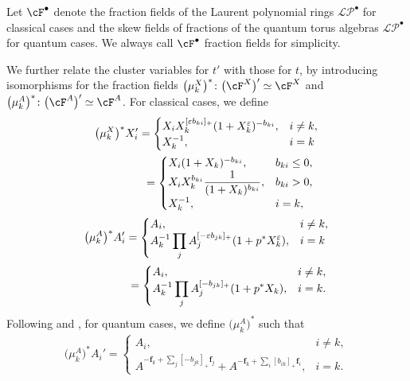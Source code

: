 \documentclass[pdftex]{sigma}
\newcommand{\LP}{{\mathcal{LP}}}
\newcommand{\ff}{\mathbf{f}}
\numberwithin{equation}{section}
\begin{document}
Let $\cF^\bullet$ denote the fraction fields of the Laurent polynomial rings $\LP^\bullet$ for classical cases and the skew fields of fractions of the quantum torus algebras $\LP^\bullet$ for quantum cases. We always call $\cF^\bullet$ fraction fields for simplicity.

We further relate the cluster variables for $t'$ with those for $t$,
by introducing isomorphisms for the fraction fields $\big(\mu_{k}^{X}\big)^{*}\colon\big(\cF^{X}\big)'\simeq\cF^{X}$
and $\big(\mu_{k}^{A}\big)^{*}\colon\big(\cF^{A}\big)'\simeq\cF^{A}$. For classical cases, we define
\begin{gather*}
\big(\mu_{k}^{X}\big)^{*}X_{i}' =\begin{cases}
X_{i}X_{k}^{[\varepsilon b_{ki}]_{+}}(1+X_{k}^{\varepsilon})^{-b_{ki}},& i\neq k,\\
X_{k}^{-1}, & i=k
\end{cases}\\
\hphantom{\big(\mu_{k}^{X}\big)^{*}X_{i}'}{} =\begin{cases}
X_{i}(1+X_{k})^{-b_{ki}}, & b_{ki}\leq0,\\
\displaystyle X_{i}X_{k}^{b_{ki}}\frac{1}{(1+X_{k})^{b_{ki}}},& b_{ki}>0,\\
X_{k}^{-1}, & i=k,
\end{cases}\\
\big(\mu_{k}^{A}\big)^{*}A_{i}' =\begin{cases}
 A_{i}, & i\neq k,\\
 \displaystyle A_{k}^{-1}\prod_{j}A_{j}^{[-\varepsilon b_{jk}]_{+}}(1+p^{*}X_{k}^\varepsilon), & i=k
\end{cases} \\
\hphantom{\big(\mu_{k}^{A}\big)^{*}A_{i}'}{}
=\begin{cases}
A_{i}, & i\neq k,\\
\displaystyle A_{k}^{-1}\prod_{j}A_{j}^{[-b_{jk}]_{+}}(1+p^{*}X_{k}), & i=k.
\end{cases}
\end{gather*}
Following \cite[equation (2.6)]{qin2019bases} and \cite[equations (2.2) and (2.4)]{qin2020dual}, for quantum cases, we define $\big(\mu_{k}^{A}\big)^{*}$ such that
 \begin{align*}
 \big(\mu_{k}^{A}\big)^{*}A_{i}' =\begin{cases}
 A_{i}, & i\neq k,\\
 A^{-\ff_k+\sum_j [-b_{jk}]_{+}\ff_j}+A^{-\ff_k+\sum_i [b_{ik}]_{+}\ff_i}, & i=k.
 \end{cases}
 \end{align*}
\end{document}
